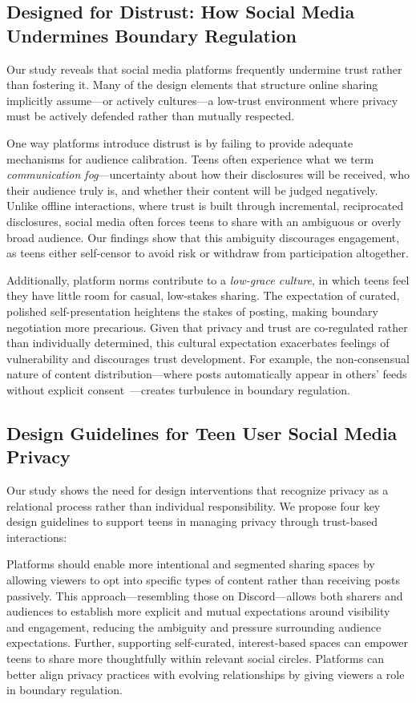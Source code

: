 \subsection{Designed for Distrust: How Social Media Undermines Boundary Regulation}
% 
Our study reveals that social media platforms frequently undermine trust rather than fostering it. Many of the design elements that structure online sharing implicitly assume---or actively cultures---a low-trust environment where privacy must be actively defended rather than mutually respected. 

One way platforms introduce distrust is by failing to provide adequate mechanisms for audience calibration. Teens often experience what we term \textit{communication fog}---uncertainty about how their disclosures will be received, who their audience truly is, and whether their content will be judged negatively. Unlike offline interactions, where trust is built through incremental, reciprocated disclosures, social media often forces teens to share with an ambiguous or overly broad audience. Our findings show that this ambiguity discourages engagement, as teens either self-censor to avoid risk or withdraw from participation altogether.

Additionally, platform norms contribute to a \textit{low-grace culture}, in which teens feel they have little room for casual, low-stakes sharing. The expectation of curated, polished self-presentation heightens the stakes of posting, making boundary negotiation more precarious. Given that privacy and trust are co-regulated rather than individually determined, this cultural expectation exacerbates feelings of vulnerability and discourages trust development. For example, the non-consensual nature of content distribution---where posts automatically appear in others' feeds without explicit consent~\cite{Im2021-ri}---creates turbulence in boundary regulation. 



\subsection{Design Guidelines for Teen User Social Media Privacy}
Our study shows the need for design interventions that recognize privacy as a relational process rather than individual responsibility. We propose four key design guidelines to support teens in managing privacy through trust-based interactions:

 Platforms should enable more intentional and segmented sharing spaces by allowing viewers to opt into specific types of content rather than receiving posts passively. This approach---resembling those on Discord---allows both sharers and audiences to establish more explicit and mutual expectations around visibility and engagement, reducing the ambiguity and pressure surrounding audience expectations. Further, supporting self-curated, interest-based spaces can empower teens to share more thoughtfully within relevant social circles. Platforms can better align privacy practices with evolving relationships by giving viewers a role in boundary regulation.

